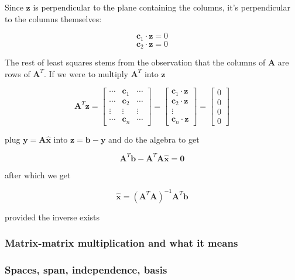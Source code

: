 \documentclass[main.tex]{subfiles}
\begin{document}
    Since $\mathbf{z}$ is perpendicular to the plane containing the columns, it's perpendicular to the columns themselves:
    
    $$\mathbf{c}_{1} \cdot \mathbf{z}=0$$
    $$\mathbf{c}_{2} \cdot \mathbf{z}=0$$
    
    The rest of least squares stems from the observation that the columns of $\mathbf{A}$ are rows of $\mathbf{A}^{T}$. If we were to multiply $\mathbf{A}^{T}$ into $\mathbf{z}$
    
    $$\mathbf{A}^{T} \mathbf{z}=\left[\begin{array}{ccc}\cdots & \mathbf{c}_{1} & \cdots \\ \cdots & \mathbf{c}_{2} & \cdots \\ \vdots & \vdots & \vdots \\ \cdots & \mathbf{c}_{n} & \cdots\end{array}\right]=\left[\begin{array}{c}\mathbf{c}_{1} \cdot \mathbf{z} \\ \mathbf{c}_{2} \cdot \mathbf{z} \\ \vdots \\ \mathbf{c}_{n} \cdot \mathbf{z}\end{array}\right]=\left[\begin{array}{l}0 \\ 0 \\ 0 \\ 0\end{array}\right]$$
    
    plug $\mathbf{y}=\mathbf{A} \hat{\mathbf{x}}$ into $\mathbf{z}=\mathbf{b}-\mathbf{y}$ and do the algebra to get 
    
    $$\mathbf{A}^{T} \mathbf{b}-\mathbf{A}^{T} \mathbf{A} \hat{\mathbf{x}}=\mathbf{0}$$
    
    after which we get
    
    $$\hat{\mathbf{x}}=\left(\mathbf{A}^{T} \mathbf{A}\right)^{-1} \mathbf{A}^{T} \mathbf{b}$$
    
    provided the inverse exists
    
    \subsubsection{Matrix-matrix multiplication and what it means}
    
    \subsubsection{Spaces, span, independence, basis}
    
\end{document}
